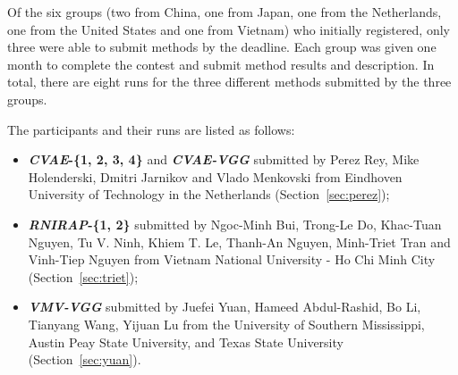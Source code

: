 \documentclass[../main.tex]{subfiles}
\begin{document}
Of the six groups (two from China, one from Japan, one from the Netherlands, one from the United States and one from Vietnam) who initially registered, only three were able to submit methods by the deadline. Each group was given one month to complete the contest and  submit method results and description. In total, there are eight runs for the three different methods submitted by the three groups. 

The participants and their runs are listed as follows:

\begin{itemize}
	
	\item  \textbf{\textit{CVAE}-\{1, 2, 3, 4\} } and 
	\textbf{\textit{CVAE-VGG}} submitted by Perez Rey, 
	Mike Holenderski, Dmitri Jarnikov and Vlado Menkovski 
	from Eindhoven University of Technology in the 
	Netherlands (Section~\ref{sec:perez});
	
	\item  \textbf{\textit{RNIRAP}-\{1, 2\}} submitted by 
	Ngoc-Minh Bui, Trong-Le Do, Khac-Tuan Nguyen, Tu V. Ninh, 
	Khiem T. Le, Thanh-An Nguyen, Minh-Triet Tran and Vinh-Tiep 
	Nguyen from Vietnam National University - Ho Chi Minh City 
	(Section~\ref{sec:triet});

	\item  \textbf{\textit{VMV-VGG}} submitted by Juefei Yuan, Hameed Abdul-Rashid, Bo Li, Tianyang Wang, Yijuan Lu from the University of Southern Mississippi, Austin Peay State University, and Texas State University (Section~\ref{sec:yuan}).
	
\end{itemize}
\end{document}
